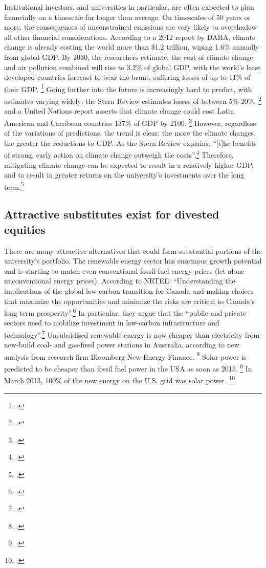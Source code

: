 Institutional investors, and universities in particular, are often expected to plan financially on a timescale far longer than average. 
On timescales of 50 years or more, the consequences of unconstrained emissions are very likely to overshadow all other financial considerations.
According to a 2012 report by DARA, climate change is already costing the world more than \$1.2 trillion, wiping 1.6\% annually from global GDP.
By 2030, the researchers estimate, the cost of climate change and air pollution combined will rise to 3.2\% of global GDP, with the world's least developed countries forecast to bear the brunt, suffering losses of up to 11\% of their GDP. \footcite{DARACVM}
Going further into the future is increasingly hard to predict, with estimates varying widely: the Stern Review estimates losses of between 5\%-20\%, \footcite{Stern2007} and a United Nations report asserts that climate change could cost Latin American and Carribean countries 137\% of GDP by 2100. \footcite{CCLatinAmerica}
However, regardless of the variations of predictions, the trend is clear: the more the climate changes, the greater the reductions to GDP.
As the Stern Review explains, ``[t]he benefits of strong, early action on climate change outweigh the costs''.\footcite[][Executive summary at: \url{http://www.hm-treasury.gov.uk/d/Executive_Summary.pdf}]{Stern2007}
Therefore, mitigating climate change can be expected to result in a relatively higher GDP, and to result in greater returns on the university's investments over the long term.\footcite[See also: ][]{EconomicCase}



	\subsection {Attractive substitutes exist for divested equities}



There are many attractive alternatives that could form substantial portions of the university's portfolio.
The renewable energy sector has enormous growth potential and is starting to match even conventional fossil-fuel energy prices (let alone unconventional energy prices).
According to NRTEE: ``Understanding the implications of the global low-carbon transition for Canada and making choices that maximize the opportunities and minimize the risks are critical to Canada's long-term prosperity''.\footcite[][p. 15]{FramingFuture}
In particular, they argue that the ``public and private sectors need to mobilize investment in low-carbon infrastructure and technology''.\footcite[][p. 17]{FramingFuture}
Unsubsidised renewable energy is now cheaper than electricity from new-build coal- and gas-fired power stations in Australia, according to new analysis from research firm Bloomberg New Energy Finance. \footcite{BlombergAussieWind}
Solar power is predicted to be cheaper than fossil fuel power in the USA as soon as 2015. \footcite{GlobalDataSolar}
In March 2013, 100\% of the new energy on the U.S. grid was solar power. \footcite{SmartPlanetSolar100}



